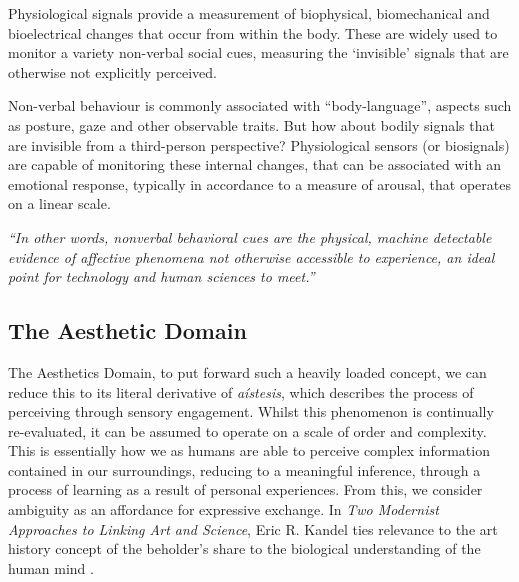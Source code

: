 Physiological signals provide a measurement of biophysical, biomechanical and bioelectrical changes that occur from within the body. These are widely used to monitor a variety non-verbal social cues, measuring the ‘invisible’ signals that are otherwise not explicitly perceived. 

Non-verbal behaviour is commonly associated with “body-language”, aspects such as posture, gaze and other observable traits. But how about bodily signals that are invisible from a third-person perspective? Physiological sensors (or biosignals) are capable of monitoring these internal changes, that can be associated with an emotional response, typically in accordance to a measure of arousal, that operates on a linear scale.

\textit{“In other words, nonverbal behavioral cues are the physical, machine detectable evidence of affective phenomena not otherwise accessible to experience, an ideal point for technology and human sciences to meet.”}
 \cite{vinciarelli_towards_2011}


\subsection{The Aesthetic Domain}

The Aesthetics Domain, to put forward such a heavily loaded concept, we can reduce this to its literal derivative of \textit{aístesis}, which describes the process of perceiving through sensory engagement. Whilst this phenomenon is continually re-evaluated, it can be assumed to operate on a scale of order and complexity. This is essentially how we as humans are able to perceive complex information contained in our surroundings, reducing to a meaningful inference, through a process of learning as a result of personal experiences. From this, we consider ambiguity as an affordance for expressive exchange. In \textit{Two Modernist Approaches to Linking Art and Science}, Eric R. Kandel ties relevance to the art history concept of the beholder's share to the biological understanding of the human mind \cite{kandel_two_2013}.

